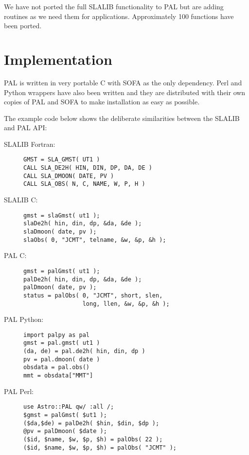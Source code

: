 We have not ported the full SLALIB functionality to PAL but are adding
routines as we need them for applications. Approximately 100 functions
have been ported.

\section{Implementation}

PAL is written in very portable C with SOFA as the only
dependency. Perl and Python wrappers have also been written and they
are distributed with their own copies of PAL and SOFA to make
installation as easy as possible.

The example code below shows the deliberate similarities between the
SLALIB and PAL API:

\newpage
\begin{description}

\item[SLALIB Fortran:] \mbox{}

\begin{verbatim}
GMST = SLA_GMST( UT1 )
CALL SLA_DE2H( HIN, DIN, DP, DA, DE )
CALL SLA_DMOON( DATE, PV )
CALL SLA_OBS( N, C, NAME, W, P, H )
\end{verbatim}

\item[SLALIB C:] \mbox{}

\begin{verbatim}
gmst = slaGmst( ut1 );
slaDe2h( hin, din, dp, &da, &de );
slaDmoon( date, pv );
slaObs( 0, "JCMT", telname, &w, &p, &h );
\end{verbatim}

\item[PAL C:] \mbox{}

\begin{verbatim}
gmst = palGmst( ut1 );
palDe2h( hin, din, dp, &da, &de );
palDmoon( date, pv );
status = palObs( 0, "JCMT", short, slen,
                 long, llen, &w, &p, &h );
\end{verbatim}

\item[PAL Python:] \mbox{}

\begin{verbatim}
import palpy as pal
gmst = pal.gmst( ut1 )
(da, de) = pal.de2h( hin, din, dp )
pv = pal.dmoon( date )
obsdata = pal.obs()
mmt = obsdata["MMT"]
\end{verbatim}

\item[PAL Perl:] \mbox{}

\begin{verbatim}
use Astro::PAL qw/ :all /;
$gmst = palGmst( $ut1 );
($da,$de) = palDe2h( $hin, $din, $dp );
@pv = palDmoon( $date );
($id, $name, $w, $p, $h) = palObs( 22 );
($id, $name, $w, $p, $h) = palObs( "JCMT" );

\end{verbatim}

\end{description}

